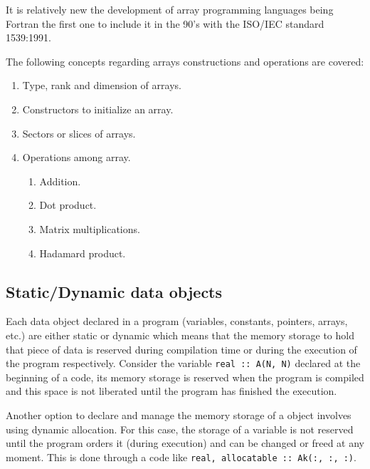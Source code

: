 It is relatively new the development of array programming languages being Fortran the first one to include it in the 90's with the 
ISO/IEC standard 1539:1991. 

The following concepts regarding arrays constructions and operations are covered:

\begin{enumerate} 
    \item Type, rank and dimension of arrays.
    \item Constructors to initialize an array. 
    \item Sectors or slices of arrays. 
    \item Operations among array. 
    
    \begin{enumerate}
        \item Addition. 
        \item Dot product.
        \item Matrix multiplications. 
        \item Hadamard product. 
    \end{enumerate}  
    
\end{enumerate} 

    \vspace{-.5cm}
    \subsection*{Static/Dynamic data objects}

Each data object declared in a program (variables, constants, pointers, arrays, etc.) are either static or dynamic 
which means that the memory storage to hold that piece of data is reserved during compilation time or 
during the execution of the program respectively. Consider the variable \texttt{real :: A(N, N)} declared at the 
beginning of a code, its memory storage is reserved when the program is compiled and this space is not liberated 
until the program has finished the execution. 

Another option to declare and manage the memory storage of a object involves using dynamic allocation. For this case, the 
storage of a variable is not reserved until the program orders it (during execution) and can be changed or freed at any moment. 
This is done through a code like \texttt{real, allocatable :: Ak(:, :, :)}.





